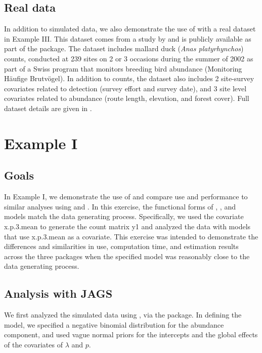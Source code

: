 \documentclass[article]{jss}
\begin{document}
\subsection[Real data]{Real data}
In addition to simulated data, we also demonstrate the use of  with a real dataset in Example III.  This dataset comes from a study by \cite{Kery_Royle_Schmid_2005} and is publicly available as part of the  package.  The dataset includes mallard duck (\emph{Anas platyrhynchos}) counts, conducted at 239 sites on 2 or 3 occasions during the summer of 2002 as part of a Swiss program that monitors breeding bird abundance (Monitoring H\"{a}ufige Brutv\"{o}gel). In addition to counts, the dataset also includes 2 site-survey covariates related to detection (survey effort and survey date), and 3 site level covariates related to abundance (route length, elevation, and forest cover).  Full dataset details are given in \cite{Kery_Royle_Schmid_2005}.

\section[Example I]{Example I}
\subsection[Goals]{Goals}
In Example I, we demonstrate the use of  and compare use and performance to similar analyses using  and .  In this exercise, the functional forms of , , and  models match the data generating process.  Specifically, we used the covariate x.p.3.mean to generate the count matrix y1 and analyzed the data with models that use x.p.3.mean as a covariate.  This exercise was intended to demonstrate the differences and similarities in use, computation time, and estimation results across the three packages when the specified model was reasonably close to the data generating process.

\subsection[Analysis with JAGS]{Analysis with JAGS}
We first analyzed the simulated data using , via the  package. In defining the model, we specified a negative binomial distribution for the abundance component, and used vague normal priors for the intercepts and the global effects of the covariates of $\lambda$ and $p$.
\end{document}
